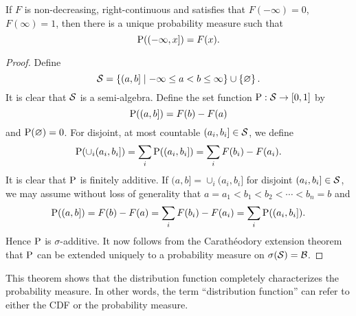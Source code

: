 \begin{theorem}
    If $F$ is non-decreasing, right-continuous and satisfies that $F(-\infty) = 0$, 
    $F(\infty) = 1$, then there is a unique probability measure such that 
    \begin{equation*}
        \P((-\infty, x]) = F(x). 
    \end{equation*}
\end{theorem}
\begin{proof}
    Define 
    \begin{equation*}
        \S = \Set{(a, b]}{-\infty \leq a < b \leq \infty} \cup \set{\varnothing}.
    \end{equation*}
    It is clear that $\S$ is a semi-algebra. Define the set function $\P:\S\to[0,1]$ 
    by 
    \begin{equation*}
        \P((a,b]) = F(b) - F(a)
    \end{equation*}
    and $\P(\varnothing) = 0$. For disjoint, at most countable $(a_i, b_i]\in\S$, we define
    \begin{equation*}
        \P\pth{\cup_i (a_i, b_i]} = \sum_i \P((a_i, b_i]) 
        = \sum_i F(b_i) - F(a_i).
    \end{equation*}
    It is clear that $\P$ is finitely additive. If $(a,b] = \cup_i (a_i, b_i]$ for disjoint 
    $(a_i, b_i]\in\S$, we may assume without loss of generality that $a = a_1 < b_1 < b_2 < \cdots < b_n = b$ 
    and 
    \begin{equation*}
        \P((a,b]) = F(b) - F(a) = \sum_i F(b_i) - F(a_i) = \sum_i \P((a_i, b_i]).
    \end{equation*}
    Hence $\P$ is $\sigma$-additive. It now follows from the Carath\'eodory extension theorem that 
    $\P$ can be extended uniquely to a probability measure on $\sigma(\S) = \B$.
\end{proof}
\begin{remark}
    This theorem shows that the distribution function completely characterizes the 
    probability measure. In other words, the term ``distribution function'' can 
    refer to either the CDF or the probability measure.
\end{remark}
